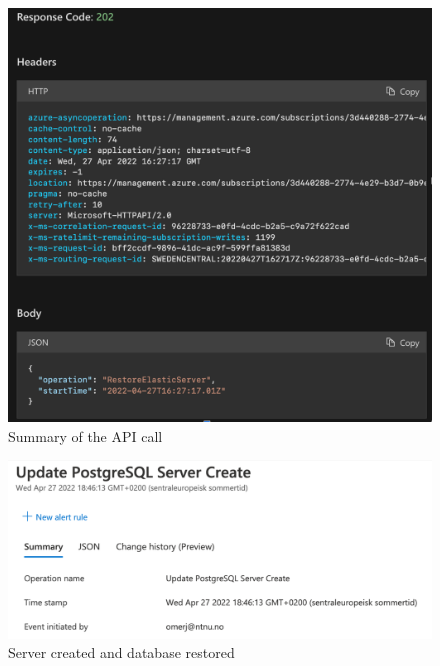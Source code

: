 \begin{figure}[H]
    \centering
    \includegraphics[width=\textwidth]{figures/postgres/recover_deleted_server.png}
    \caption{Summary of the API call}
    \label{fig:my_label}
\end{figure}

\begin{figure}[H]
    \centering
    \includegraphics[width=\textwidth]{figures/postgres/scenario2_restored.png}
    \caption{Server created and database restored}
    \label{fig:my_label}
\end{figure}
